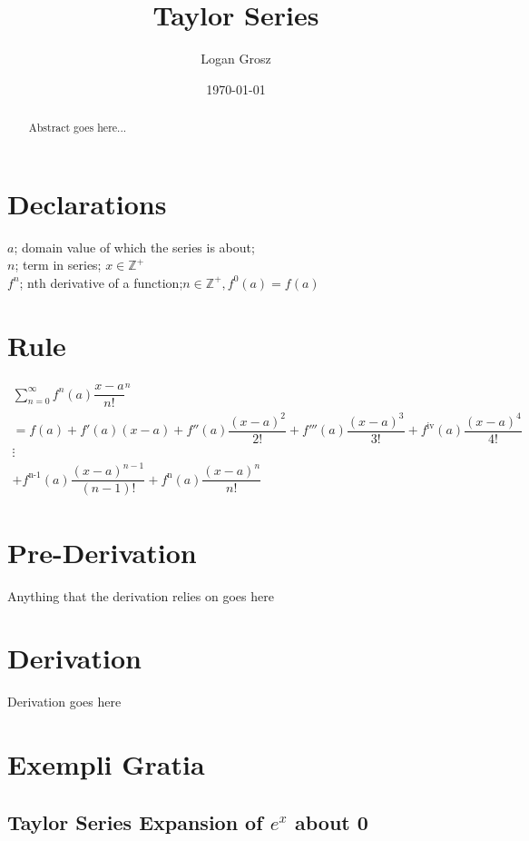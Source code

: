 \documentclass{article}
\begin{document}
	
\author{Logan Grosz}
\title{Taylor Series}
\date{\today}

\maketitle

\begin{abstract}
	Abstract goes here...
\end{abstract}

\section{Declarations}

$a$; domain value of which the series is about;\\
$n$; term in series; $x \in \mathbb{Z^+}$\\
$f^n$; nth derivative of a function;$n\in\mathbb{Z^+}, f^0(a)=f(a)$

\section{Rule}

\begin{gather*}
\sum_{n = 0}^{\infty}f^n(a)\dfrac{x-a}{n!}^n\\
= f(a)+f'(a)(x-a)+f''(a)\dfrac{(x-a)^2}{2!}+f'''(a)\dfrac{(x-a)^3}{3!}+f^{\text{iv}}(a)\dfrac{(x-a)^4}{4!}\\
\vdots\\
+ f^{\text{n-1}}(a)\dfrac{(x-a)^{n-1}}{(n-1)!} + f^{\text{n}}(a)\dfrac{(x-a)^n}{n!}
\end{gather*}

\section{Pre-Derivation}
Anything that the derivation relies on goes here

\section{Derivation}

Derivation goes here

\section{Exempli Gratia}

\subsection{Taylor Series Expansion of $e^x$ about 0}
\end{document}
